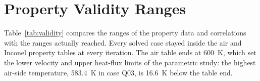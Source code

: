 

\section{Property Validity Ranges}
Table~\ref{tab:validity} compares the ranges of the property data and correlations with the ranges actually reached. Every solved case stayed
inside the air and Inconel property tables at every iteration. The air table ends at 600~K, which set the lower velocity and upper heat-flux
limits of the parametric study: the highest air-side temperature, 583.4~K in case Q03, is 16.6~K below the table end.


